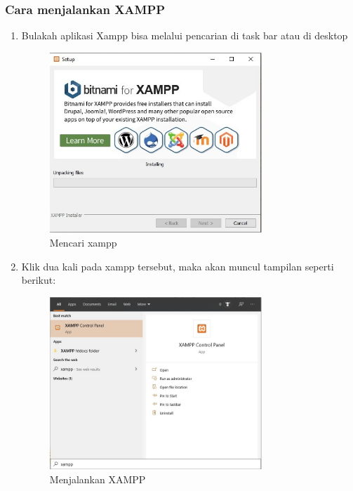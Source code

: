 \subsubsection{Cara menjalankan XAMPP}
\begin{enumerate}
\item Bulakah aplikasi Xampp bisa melalui pencarian di task bar atau di desktop
	\begin{figure}[H]
		\includegraphics[width=8cm]{figures/instalasi/xampp8.jpg}
		\centering
		\caption{Mencari xampp}
	\end{figure}

\item Klik dua kali pada xampp tersebut, maka akan muncul tampilan seperti berikut:	
	\begin{figure}[H]
		\includegraphics[width=8cm]{figures/instalasi/xampp9.jpg}
		\centering
		\caption{Menjalankan XAMPP}
	\end{figure}
	

\end{enumerate}
